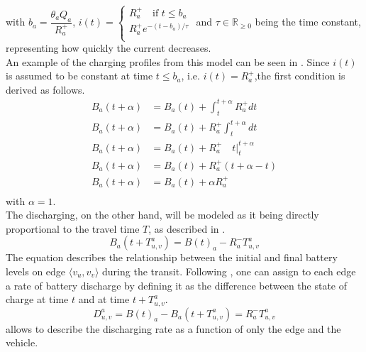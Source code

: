 with $b_a = \dfrac{\theta_a Q_a}{R^+_a}$,  $i(t)= \begin{cases} R^+_a \quad \text{if } t \leq  b_a\\
	R^+_a e^{-(t-b_a)/\tau}\\ \end{cases}$ and $\tau \in \mathbb{R}_{\ge0}$ being the time constant, representing how quickly the current decreases. \\
	An example of the charging profiles from this model can be seen in . 
	 Since $i(t)$ is assumed to be constant at time $t\leq b_a$, i.e. $i(t) = R^+_a$,the first condition is derived as follows. 
\begin{align*}
	B_a(t+\alpha) &= B_a(t) + \int_{t}^{t+\alpha}R^+_adt\\
	B_a(t+\alpha) &= B_a(t) +R^+_a \int_{t}^{t+\alpha}dt\\
	B_a(t+\alpha) &= B_a(t) +R^+_a \quad t \bigg|_{t}^{t+\alpha}\\
	B_a(t+\alpha) &= B_a(t) +R^+_a (t+\alpha - t)\\
	B_a(t+\alpha) &= B_a(t) +\alpha R^+_a\\
\end{align*}
with $\alpha = 1$. \\
The discharging, on the other hand, will be modeled as it being directly proportional to the travel time $T$, as described in . 
\begin{equation}
	B_a(t+T_{u,v}^a) = B(t)_a - R^-_a T_{u,v}^a
	\label{eq:discharging}
\end{equation} 
The equation describes the relationship between the initial and final battery levels on edge $\langle v_u, v_v \rangle$ during the transit. Following , one can assign to each edge a rate of battery discharge by defining it as the difference between the state of charge at time $t$ and at time $t+T_{u,v}^a$. \\
\begin{equation}
	 D^a_{u,v} = B(t)_a - B_a(t+T_{u,v}^a) =  R^-_a T_{u,v}^a
	\label{eq:discharging_rate_per_edge}
\end{equation} 
 allows to describe the discharging rate as a function of only the edge and the vehicle. \\
